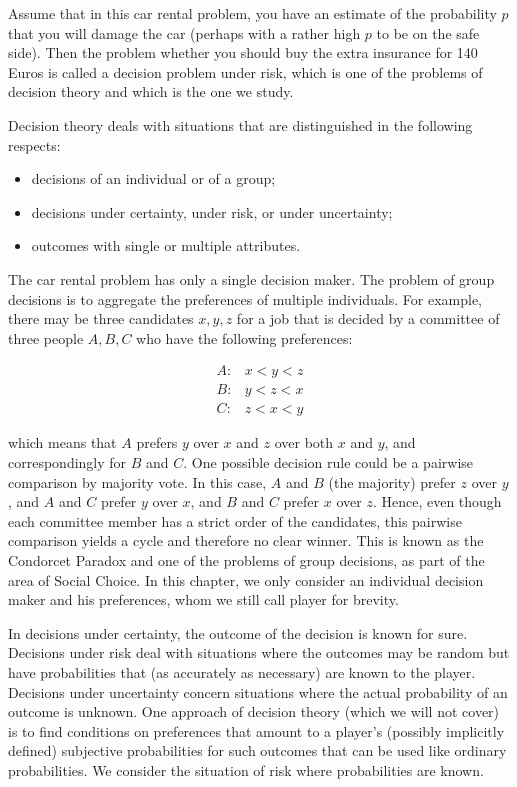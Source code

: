 \documentclass[12pt]{article}
\begin{document}
Assume that in this car rental problem, you have an estimate of the probability $p$ that you will damage the car (perhaps with a rather high $p$ to be on the safe side). Then the problem whether you should buy the extra insurance for 140 Euros is called a decision problem under risk, which is one of the problems of decision theory and which is the one we study.

Decision theory deals with situations that are distinguished in the following respects:

\begin{itemize}
  \item decisions of an individual or of a group;
  \item decisions under certainty, under risk, or under uncertainty;
  \item outcomes with single or multiple attributes.
\end{itemize}

The car rental problem has only a single decision maker. The problem of group decisions is to aggregate the preferences of multiple individuals. For example, there may be three candidates $x, y, z$ for a job that is decided by a committee of three people $A, B, C$ who have the following preferences:

\[
\begin{array}{ll}
A: & x<y<z \\
B: & y<z<x  \tag{5.3}\\
C: & z<x<y
\end{array}
\]

which means that $A$ prefers $y$ over $x$ and $z$ over both $x$ and $y$, and correspondingly for $B$ and $C$. One possible decision rule could be a pairwise comparison by majority vote. In this case, $A$ and $B$ (the majority) prefer $z$ over $y$, and $A$ and $C$ prefer $y$ over $x$, and $B$ and $C$ prefer $x$ over $z$. Hence, even though each committee member has a strict order of the candidates, this pairwise comparison yields a cycle and therefore no clear winner. This is known as the Condorcet Paradox and one of the problems of group decisions, as part of the area of Social Choice. In this chapter, we only consider an individual decision maker and his preferences, whom we still call player for brevity.

In decisions under certainty, the outcome of the decision is known for sure. Decisions under risk deal with situations where the outcomes may be random but have probabilities that (as accurately as necessary) are known to the player. Decisions under uncertainty concern situations where the actual probability of an outcome is unknown. One approach of decision theory (which we will not cover) is to find conditions on preferences that amount to a player's (possibly implicitly defined) subjective probabilities for such outcomes that can be used like ordinary probabilities. We consider the situation of risk where probabilities are known.
\end{document}

